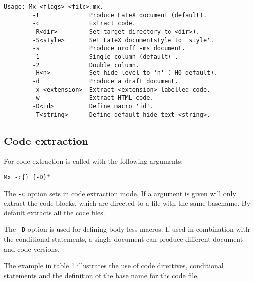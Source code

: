 \begin{verbatim}
Usage: Mx <flags> <file>.mx.
        -t              Produce LaTeX document (default).
        -c              Extract code.
        -R<dir>         Set target directory to <dir>).
        -S<style>       Set LaTeX documentstyle to 'style'.
        -s              Produce nroff -ms document.
        -1              Single column (default) .
        -2              Double column.
        -H<n>           Set hide level to 'n' (-H0 default).
        -d              Produce a draft document.
        -x <extension>  Extract <extension> labelled code.
        -w              Extract HTML code.
        -D<id>          Define macro 'id'.
        -T<string>      Define default hide text <string>.
\end{verbatim}

\subsection{Code extraction}

For code extraction \Mx is called with the following arguments:
\noindent
\begin{center}
        {\tt Mx -c\{\file\} \{-D\macro\}$^+$ \mxfile }
\end{center}

The {\tt -c} option sets \Mx in code extraction mode. If a \file
argument is given \Mx will only extract the code blocks, which are
directed to a file with the same basename. 
By default \Mx extracts all the code files. 

The {\tt -D\macro} option is used for defining body-less macros. If used in
combination with the conditional statements, a single \Mx document can
produce different document and code versions.

The example in table 1 illustrates the use of code directives,
conditional statements and the definition of the base name for the
code file.


